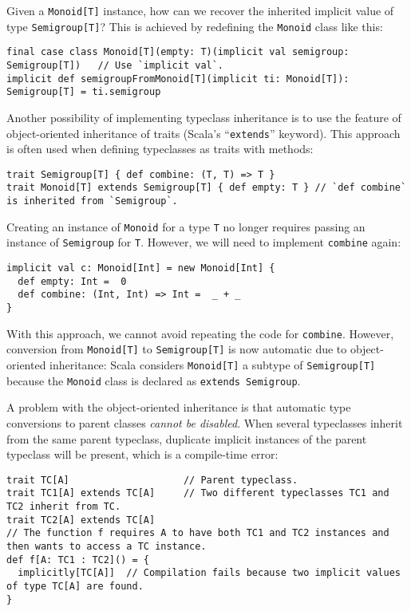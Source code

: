 Given a \lstinline!Monoid[T]! instance, how can we recover the inherited
implicit value of type \lstinline!Semigroup[T]!? This is achieved
by redefining the \lstinline!Monoid! class like this:
\begin{lstlisting}
final case class Monoid[T](empty: T)(implicit val semigroup: Semigroup[T])   // Use `implicit val`.
implicit def semigroupFromMonoid[T](implicit ti: Monoid[T]): Semigroup[T] = ti.semigroup
\end{lstlisting}

Another possibility of implementing typeclass inheritance is to use
the feature of object-oriented inheritance
of traits (Scala\textsf{'}s \textsf{``}\lstinline!extends!\textsf{''} keyword). This approach
is often used when defining typeclasses as traits with methods:
\begin{lstlisting}
trait Semigroup[T] { def combine: (T, T) => T }
trait Monoid[T] extends Semigroup[T] { def empty: T } // `def combine` is inherited from `Semigroup`.
\end{lstlisting}
Creating an instance of \lstinline!Monoid! for a type \lstinline!T!
no longer requires passing an instance of \lstinline!Semigroup! for
\lstinline!T!. However, we will need to implement \lstinline!combine!
again:
\begin{lstlisting}
implicit val c: Monoid[Int] = new Monoid[Int] {
  def empty: Int =  0
  def combine: (Int, Int) => Int =  _ + _
}
\end{lstlisting}
With this approach, we cannot avoid repeating the code for \lstinline!combine!.
However, conversion from \lstinline!Monoid[T]! to \lstinline!Semigroup[T]!
is now automatic due to object-oriented inheritance:
Scala considers \lstinline!Monoid[T]! a subtype of \lstinline!Semigroup[T]!
because the \lstinline!Monoid! class is declared as \lstinline!extends Semigroup!.

A problem with the object-oriented inheritance is that automatic type
conversions to parent classes \emph{cannot be disabled}. When several
typeclasses inherit from the same parent typeclass, duplicate implicit
instances of the parent typeclass will be present, which is a compile-time
error:
\begin{lstlisting}
trait TC[A]                    // Parent typeclass.
trait TC1[A] extends TC[A]     // Two different typeclasses TC1 and TC2 inherit from TC.
trait TC2[A] extends TC[A]
// The function f requires A to have both TC1 and TC2 instances and then wants to access a TC instance.
def f[A: TC1 : TC2]() = {
  implicitly[TC[A]]  // Compilation fails because two implicit values of type TC[A] are found.
}
\end{lstlisting}


